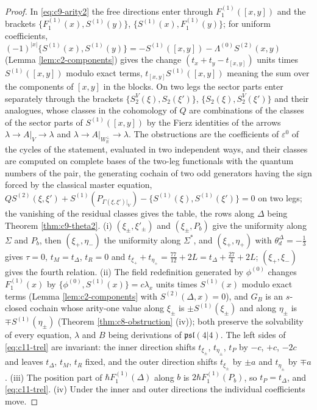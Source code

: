 \begin{proof}
In \eqref{eq:c9-arity2} the free directions enter through $F_1^{(1)}([x,y])$ and the brackets $\{F_1^{(1)}(x),S^{(1)}(y)\}$, $\{S^{(1)}(x),F_1^{(1)}(y)\}$; for uniform coefficients, $(-1)^{|x|}\{S^{(1)}(x),S^{(1)}(y)\}=-S^{(1)}([x,y])-\Lambda^{(0)}S^{(2)}(x,y)$ (Lemma \ref{lem:c2-components}) gives the change $(t_x+t_y-t_{[x,y]})$ units times $S^{(1)}([x,y])$ modulo exact terms, $t_{[x,y]}S^{(1)}([x,y])$ meaning the sum over the components of $[x,y]$ in the blocks. On two legs the sector parts enter separately through the brackets $\{S^V_2(\xi),S_2(\xi')\}$, $\{S_2(\xi),S^V_2(\xi')\}$ and their analogues, whose classes in the cohomology of $Q$ are combinations of the classes of the sector parts of $S^{(1)}([x,y])$ by the Fierz identities of the arrows $\lambda\to A|_V\to\lambda$ and $\lambda\to A|_{W_{\mathbb R}^\perp}\to\lambda$. The obstructions are the coefficients of $\varepsilon^0$ of the cycles of the statement, evaluated in two independent ways, and their classes are computed on complete bases of the two-leg functionals with the quantum numbers of the pair, the generating cochain of two odd generators having the sign forced by the classical master equation, $QS^{(2)}(\xi,\xi')+S^{(1)}(P_{\Gamma(\xi,\xi')|_V})-\{S^{(1)}(\xi),S^{(1)}(\xi')\}=0$ on two legs; the vanishing of the residual classes gives the table, the rows along $\Delta$ being Theorem \ref{thm:c9-theta2}. (i) $(\xi_\pm,\xi'_\pm)$ and $(\xi_\pm,P_b)$ give the uniformity along $\Sigma$ and $P_b$, then $(\xi_+,\eta_-)$ the uniformity along $\Sigma^*$, and $(\xi_+,\eta_+)$ with $\theta^\Delta_d=-\tfrac13$ gives $\tau=0$, $t_M=t_\Delta$, $t_R=0$ and $t_{\xi_+}+t_{\eta_+}=\tfrac{77}{12}+2L=t_\Delta+\tfrac{27}4+2L$; $(\xi_+,\xi_-)$ gives the fourth relation. (ii) The field redefinition generated by $\phi^{(0)}$ changes $F_1^{(1)}(x)$ by $\{\phi^{(0)},S^{(1)}(x)\}=c\lambda_x$ units times $S^{(1)}(x)$ modulo exact terms (Lemma \ref{lem:c2-components} with $S^{(2)}(\Delta,x)=0$), and $G_B$ is an $s$-closed cochain whose arity-one value along $\xi_\pm$ is $\pm S^{(1)}(\xi_\pm)$ and along $\eta_\pm$ is $\mp S^{(1)}(\eta_\pm)$ (Theorem \ref{thm:c8-obstruction} (iv)); both preserve the solvability of every equation, $\lambda$ and $B$ being derivations of $\mathfrak{psl}(4|4)$. The left sides of \eqref{eq:c11-trel} are invariant: the inner direction shifts $t_{\xi_\pm}$, $t_{\eta_\pm}$, $t_P$ by $-c$, $+c$, $-2c$ and leaves $t_\Delta$, $t_M$, $t_R$ fixed, and the outer direction shifts $t_{\xi_\pm}$ by $\pm a$ and $t_{\eta_\pm}$ by $\mp a$. (iii) The position part of $\hbar F_1^{(1)}(\Delta)$ along $b$ is $2\hbar F_1^{(1)}(P_b)$, so $t_P=t_\Delta$, and \eqref{eq:c11-trel}. (iv) Under the inner and outer directions the individual coefficients move.
\end{proof}

